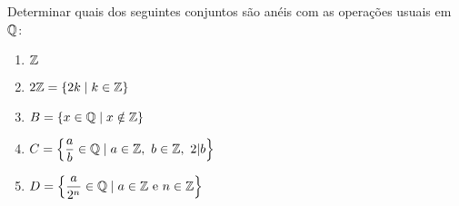 \documentclass[12pt]{exam}
\begin{document}
    \questao{} Determinar quais dos seguintes conjuntos são anéis com as operações usuais em $\mathbb{Q}$:
        \begin{multicols}{2}
            \begin{enumerate}[label=({\alph*})]
                \item $\mathbb{Z}$
                \item $2\mathbb{Z} = \{2k \mid k \in \mathbb{Z}\}$
                \item $B = \{x \in \mathbb{Q} \mid x \notin \mathbb{Z}\}$
                \item $C = \left\{\dfrac{a}{b} \in \mathbb{Q} \mid a \in \mathbb{Z},\ b \in \mathbb{Z},\ 2 |b \right\}$
                \item $D = \left\{\dfrac{a}{2^n} \in \mathbb{Q} \mid a \in \mathbb{Z} \mbox{ e } n \in \mathbb{Z} \right\}$
            \end{enumerate}
        \end{multicols}

    \vspace{.3cm}
\end{document}
